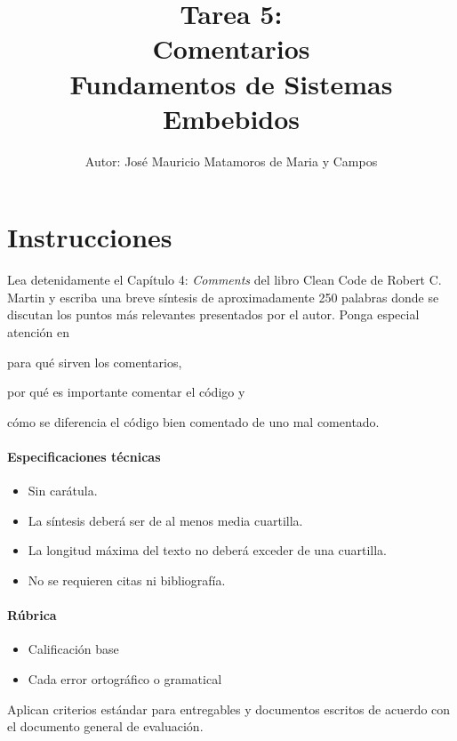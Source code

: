 \documentclass[letterpaper,10.5pt]{article}
\title{Tarea 5:\\Comentarios\\
{\large Fundamentos de Sistemas Embebidos}}
\author{\footnotesize Autor: José Mauricio Matamoros de Maria y Campos}
\date{}
\begin{document}
\maketitle
\thispagestyle{empty}


\section{Instrucciones}%
\label{sec:instructions}
Lea detenidamente el Capítulo 4: \emph{Comments} del libro Clean Code de Robert C. Martin y escriba una breve síntesis de aproximadamente 250 palabras donde se discutan los puntos más relevantes presentados por el autor.
Ponga especial atención en
\begin{enumerate*}[label=\roman*\rpar]
	\item para qué sirven los comentarios,
	\item por qué es importante comentar el código
	y
	\item cómo se diferencia el código bien comentado de uno mal comentado.
\end{enumerate*}

\paragraph{Especificaciones técnicas}
\begin{itemize}
	\item Sin carátula.
	\item La síntesis deberá ser de al menos media cuartilla.
	\item La longitud máxima del texto no deberá exceder de una cuartilla.
	\item No se requieren citas ni bibliografía.
\end{itemize}

\paragraph{Rúbrica}
\begin{itemize}
	\item {} Calificación base
	\item {} Cada error ortográfico o gramatical
\end{itemize}
Aplican criterios estándar para entregables y documentos escritos de acuerdo con el documento general de evaluación.
\end{document}
